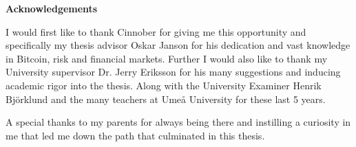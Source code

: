 \vspace*{7cm}

\begin{center}
	\textbf{Acknowledgements}
\end{center} 

I would first like to thank Cinnober for giving me this opportunity and specifically my thesis advisor Oskar Janson for his dedication and vast knowledge in Bitcoin, risk and financial markets.
Further I would also like to thank my University supervisor Dr. Jerry Eriksson for his many suggestions and inducing academic rigor into the thesis. Along with the University Examiner Henrik Bj\"{o}rklund and the many teachers at Umeå University for these last 5 years. 
  
A special thanks to my parents for always being there and instilling a curiosity in me that led me down the path that culminated in this thesis. 
